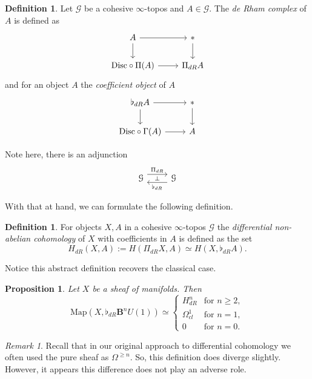\documentclass[a4paper]{book}
\newcommand{\lG}{\mathcal{G}}
\newtheorem{proposition}[equation]{Proposition}
\theoremstyle{definition}
\newtheorem{definition}[equation]{Definition}
\theoremstyle{remark}
\newtheorem{remark}[equation]{Remark}
\numberwithin{equation}{section}
\begin{document}
\begin{definition}
	Let $\lG$ be a cohesive $\infty$-topos and $A	\in \lG$. The \emph{de Rham complex} of $A$ is defined as
	\[
	\begin{tikzcd}
	 A \arrow[d] \arrow[r] & * \arrow[d] \\
		\mathrm{Disc} \circ \Pi(A) \arrow[r] &  \Pi_{dR}A
	\end{tikzcd}	
	\]
	and for an object $A$ the \emph{coefficient object} of $A$
	\[
	\begin{tikzcd}
		\flat_{dR}A \arrow[d] \arrow[r]	& * \arrow[d] \\
		\mathrm{Disc} \circ \Gamma(A) \arrow[r] & A 
	\end{tikzcd}
	\]
\end{definition}

Note here, there is an adjunction 
\[ 
\begin{tikzcd}
	\lG \arrow[r, shift left=2, "\Pi_{dR}", "\bot"'] & \lG \arrow[l, shift left=2, "\flat_{dR}"]
\end{tikzcd}
\]

With that at hand, we can formulate the following definition.

\begin{definition}
	For objects $X,A$ in a cohesive $\infty$-topos $\lG$ the \emph{differential non-abelian cohomology} of $X$ with coefficients in $A$ is defined as the set
	\[	H_{dR}(X, A) := H(\Pi_{dR}X,A) \simeq H(X, \flat_{dR} A). \]
\end{definition}

Notice this abstract definition recovers the classical case. 

\begin{proposition} \label{prop:cohomologycomputation}
 Let $X$ be a sheaf of manifolds. Then 
	\[ \mathrm{Map}(X,\flat_{dR}	\mathbf{B}^n U(1)) \simeq 
	\begin{cases}
	 H^{n}_{dR} & \text{for } n \geq 2, \\
		\Omega^1_{cl} & \text{for } n = 1, \\
		0 & \text{for } n = 0.
	\end{cases} 	
	\]
\end{proposition}

\begin{remark}
	Recall that in our original approach to differential cohomology we often used the pure sheaf as $\Omega^{\geq n}$. So, this definition does diverge slightly. However, it appears this difference does not play an adverse role.
\end{remark}
\end{document}
